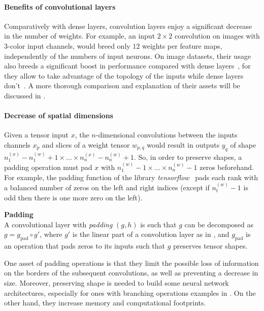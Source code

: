 \paragraph{Benefits of convolutional layers}
Comparatively with dense layers, convolution layers enjoy a significant decrease in the number of weights. For example, an input $2 \times 2$ convolution on images with $3$-color input channels, would breed only $12$ weights per feature maps, independently of the numbers of input neurons. On image datasets, their usage also breeds a significant boost in performance compared with dense layers~\citep{krizhevsky2012imagenet}, for they allow to take advantage of the topology of the inputs while dense layers don't~\citep{lecun1995convolutional}. A more thorough comparison and explanation of their assets will be discussed in .

\paragraph{Decrease of spatial dimensions}
Given a tensor input $x$, the $n$-dimensional convolutions between the inputs channels $x_p$ and slices of a weight tensor $w_{p,q}$ would result in outputs $y_q$ of shape $n_1^{(x)} - n_1^{(w)} + 1 \times \ldots \times n_n^{(x)} - n_n^{(w)} + 1$. So, in order to preserve shapes, a padding operation must pad $x$ with $n_1^{(w)} - 1 \times \ldots \times n_n^{(w)} - 1$ zeros beforehand. For example, the padding function of the library \emph{tensorflow}~\citep{tensorflow2015-whitepaper} pads each rank with a balanced number of zeros on the left and right indices (except if $n_t^{(w)} - 1$ is odd then there is one more zero on the left).

\begin{definition}\textbf{Padding}\\
A convolutional layer with \emph{padding} $(g, h)$ is such that $g$ can be decomposed as $g = g_\text{pad} \circ g'$, where $g'$ is the linear part of a convolution layer as in , and $g_\text{pad}$ is an operation that pads zeros to its inputs such that $g$ preserves tensor shapes.
\end{definition}

\begin{remark}
One asset of padding operations is that they limit the possible loss of information on the borders of the subsequent convolutions, as well as preventing a decrease in size. Moreover, preserving shape is needed to build some neural network architectures, especially for ones with branching operations \eg examples in . On the other hand, they increase memory and computational footprints.
\end{remark}


